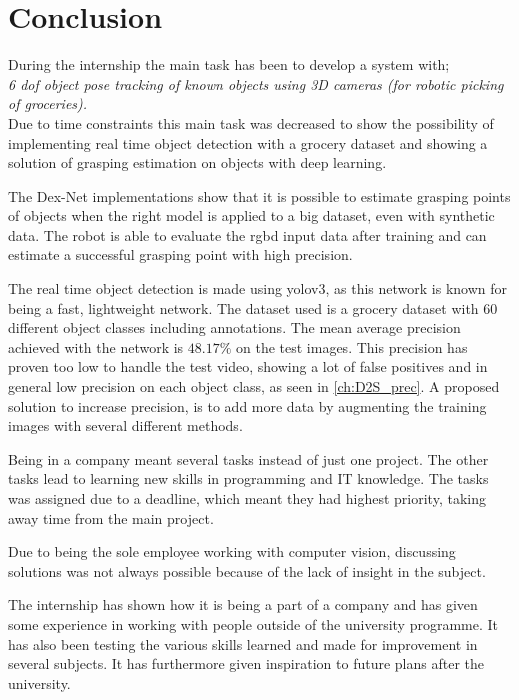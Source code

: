 \chapter{Conclusion}\label{ch:conclusion}\glsresetall
During the internship the main task has been to develop a system with;\\

\textit{6 \gls{dof} object pose tracking of known objects using 3D cameras (for robotic picking of groceries).}\\

Due to time constraints this main task was decreased to show the possibility of implementing real time object detection with a grocery dataset and showing a solution of grasping estimation on objects with deep learning.

The Dex-Net implementations show that it is possible to estimate grasping points of objects when the right model is applied to a big dataset, even with synthetic data. The robot is able to evaluate the \gls{rgbd} input data after training and can estimate a successful grasping point with high precision.

The real time object detection is made using \gls{yolo}v3, as this network is known for being a fast, lightweight network. The dataset used is a grocery dataset with 60 different object classes including annotations. The mean average precision achieved with the network is $ 48.17\% $ on the test images. This precision has proven too low to handle the test video, showing a lot of false positives and in general low precision on each object class, as seen in \autoref{ch:D2S_prec}. A proposed solution to increase precision, is to add more data by augmenting the training images with several different methods.

Being in a company meant several tasks instead of just one project. The other tasks lead to learning new skills in programming and IT knowledge. The tasks was assigned due to a deadline, which meant they had highest priority, taking away time from the main project.

Due to being the sole employee working with computer vision, discussing solutions was not always possible because of the lack of insight in the subject. 

The internship has shown how it is being a part of a company and has given some experience in working with people outside of the university programme. It has also been testing the various skills learned and made for improvement in several subjects. It has furthermore given inspiration to future plans after the university.